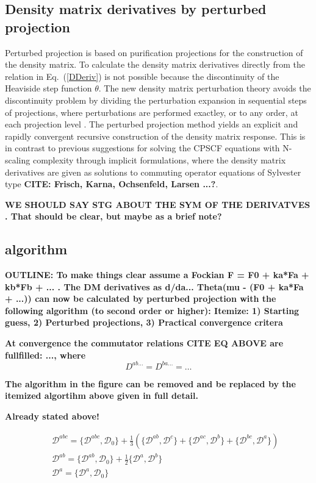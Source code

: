 \documentclass[prl,aps,twocolumn,showpacs,twocolumngrid,superbib]{revtex4}
\def\D{\mathcal{D}}
\begin{document}
\subsection{Density matrix derivatives by perturbed projection}
Perturbed projection is based on purification projections for the 
construction of the density matrix. To calculate the
density matrix derivatives directly from the relation in Eq.\ (\ref{DDeriv})
is not possible because the discontinuity of the Heaviside step function $\theta$.
The new density matrix perturbation theory avoids the discontinuity problem
by dividing the perturbation expansion in sequential steps of projections,
where perturbations are performed exactley, or to any order, at each
projection level \cite{Niklasson04}. The perturbed projection method yields
an explicit and rapidly convergent recursive construction of
the density matrix response. This is in contrast to previous suggestions for
solving the CPSCF equations with N-scaling complexity through implicit
formulations, where the density matrix derivatives are given as solutions
to commuting operator equations of Sylvester type 
{\bf CITE: Frisch, Karna, Ochsenfeld, Larsen ...?}.


{\bf WE SHOULD SAY STG ABOUT THE SYM OF THE DERIVATVES}
{\bf . That should be clear, but maybe as a brief note?}

\subsection{algorithm}

{\bf OUTLINE: To make things clear assume a Fockian F = F0 + ka*Fa + kb*Fb + ... .
The DM derivatives as d/da... Theta(mu - (F0 + ka*Fa + ...)) can now be
calculated by perturbed projection with the following algorithm (to second order or higher):
Itemize: 1) Starting guess, 2) Perturbed projections, 3) Practical convergence critera}

{\bf At convergence the commutator relations CITE EQ ABOVE are fullfilled: ..., where 
\begin{equation}
  D^{ab\ldots}=D^{ba\ldots}=\ldots
\end{equation}}

{\bf The algorithm in the figure can be removed and be replaced by the itemized
algortihm above given in full detail.}



{\bf Already stated above!}

\begin{subequations}
  \begin{eqnarray}
    && \D^{abc}=\{\D^{abc},\D_0\}+
        \frac{1}{3}(\{\D^{ab},\D^{c}\}+\{\D^{ac},\D^{b}\}+\{\D^{bc},\D^{a}\})\\
    && \D^{ab }=\{\D^{ab},\D_0\}+\frac{1}{2}\{\D^{a},\D^{b}\}\\
    && \D^{a  }=\{\D^{a},\D_0\}
  \end{eqnarray}
\end{subequations}
\end{document}
